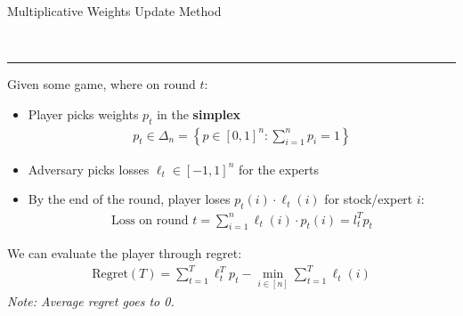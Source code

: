 \documentclass{article}
\newcommand{\header}[1]{\begin{large}\noindent #1\end{large}\\\rule{\textwidth}{0.5pt}}
\newcommand{\curly}[1]{\left\{#1\right\}}
\begin{document}
\header{Multiplicative Weights Update Method}
Given some game, where on round $t$:
\begin{itemize}
    \item Player picks weights $p_t$ in the \textbf{simplex} 
    \begin{align*}
        p_t \in \Delta_n = \curly{p \in [0, 1]^n : \sum_{i=1}^n p_i =1}
    \end{align*}
    \item Adversary picks losses $\ell_t \in [-1, 1]^n$ for the experts
    \item By the end of the round, player loses $p_t(i)\cdot \ell_t(i)$ for 
    stock/expert $i$:
    \begin{align*}
        \textrm{Loss on round }t = \sum_{i=1}^{n}\ell_t (i) \cdot p_t(i) = l_t^T p_t
    \end{align*}
\end{itemize}

We can evaluate the player through regret:
\begin{align*}
    \textrm{Regret}(T) = \sum_{t=1}^{T}\ell_t^T p_t - \min_{i\in [n]}\sum_{t=1}^{T}\ell_t(i)
\end{align*}
\textit{Note: Average regret goes to 0.}
\end{document}
